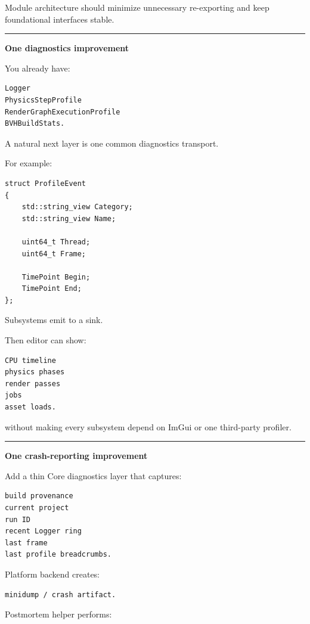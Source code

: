 Module architecture should minimize unnecessary re-exporting and keep foundational interfaces stable.

\begin{center}\rule{0.5\linewidth}{0.5pt}\end{center}

\textbf{One diagnostics improvement}

You already have:

\begin{verbatim}
Logger
PhysicsStepProfile
RenderGraphExecutionProfile
BVHBuildStats.
\end{verbatim}

A natural next layer is one common diagnostics transport.

For example:

\begin{verbatim}
struct ProfileEvent
{
    std::string_view Category;
    std::string_view Name;

    uint64_t Thread;
    uint64_t Frame;

    TimePoint Begin;
    TimePoint End;
};
\end{verbatim}

Subsystems emit to a sink.

Then editor can show:

\begin{verbatim}
CPU timeline
physics phases
render passes
jobs
asset loads.
\end{verbatim}

without making every subsystem depend on ImGui or one third-party profiler.

\begin{center}\rule{0.5\linewidth}{0.5pt}\end{center}

\textbf{One crash-reporting improvement}

Add a thin Core diagnostics layer that captures:

\begin{verbatim}
build provenance
current project
run ID
recent Logger ring
last frame
last profile breadcrumbs.
\end{verbatim}

Platform backend creates:

\begin{verbatim}
minidump / crash artifact.
\end{verbatim}

Postmortem helper performs:

